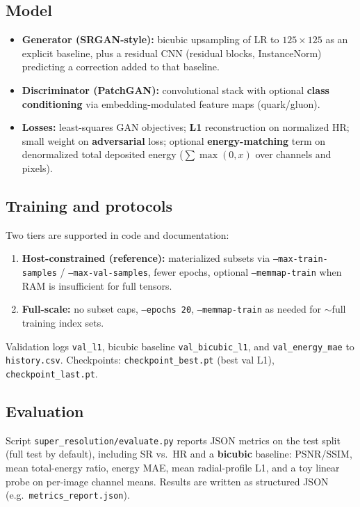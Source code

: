 \documentclass[11pt,a4paper]{article}
\begin{document}
\subsection{Model}
\begin{itemize}
  \item \textbf{Generator (SRGAN-style):} bicubic upsampling of LR to $125\times 125$ as an explicit baseline, plus a residual CNN (residual blocks, InstanceNorm) predicting a correction added to that baseline.
  \item \textbf{Discriminator (PatchGAN):} convolutional stack with optional \textbf{class conditioning} via embedding-modulated feature maps (quark/gluon).
  \item \textbf{Losses:} least-squares GAN objectives; \textbf{L1} reconstruction on normalized HR; small weight on \textbf{adversarial} loss; optional \textbf{energy-matching} term on denormalized total deposited energy ($\sum \max(0,x)$ over channels and pixels).
\end{itemize}

\subsection{Training and protocols}
Two tiers are supported in code and documentation:
\begin{enumerate}
  \item \textbf{Host-constrained (reference):} materialized subsets via \texttt{--max-train-samples} / \texttt{--max-val-samples}, fewer epochs, optional \texttt{--memmap-train} when RAM is insufficient for full tensors.
  \item \textbf{Full-scale:} no subset caps, \texttt{--epochs 20}, \texttt{--memmap-train} as needed for $\sim$full training index sets.
\end{enumerate}
Validation logs \texttt{val\_l1}, bicubic baseline \texttt{val\_bicubic\_l1}, and \texttt{val\_energy\_mae} to \texttt{history.csv}. Checkpoints: \texttt{checkpoint\_best.pt} (best val L1), \texttt{checkpoint\_last.pt}.

\subsection{Evaluation}
Script \texttt{super\_resolution/evaluate.py} reports JSON metrics on the test split (full test by default), including SR vs.\ HR and a \textbf{bicubic} baseline: PSNR/SSIM, mean total-energy ratio, energy MAE, mean radial-profile L1, and a toy linear probe on per-image channel means. Results are written as structured JSON (e.g.\ \texttt{metrics\_report.json}).
\end{document}
